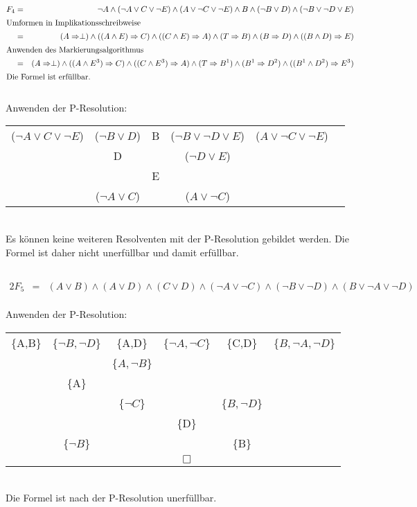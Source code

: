 \documentclass[10pt,a4paper,oneside,ngerman,numbers=noenddot]{scrartcl}
\begin{document}
\subsubsection{} %
\begin{alignat*}{2}
F_{4} &=& \neg A \wedge (\neg A \vee C \vee \neg E) \wedge (A \vee \neg C \vee \neg E) \wedge B \wedge (\neg B \vee D) \wedge (\neg B \vee \neg D \vee E) \\
\intertext{Umformen in Implikationsschreibweise}
&=& (A \Rightarrow \perp) \wedge ((A \wedge E) \Rightarrow C) \wedge ((C \wedge E) \Rightarrow A) \wedge (T \Rightarrow B) \wedge (B \Rightarrow D) \wedge ((B \wedge D) \Rightarrow E) \\
\intertext{Anwenden des Markierungsalgorithmus}
&=& (A \Rightarrow \perp) \wedge ((A \wedge E^{3}) \Rightarrow C) \wedge ((C \wedge E^{3}) \Rightarrow A) \wedge (T \Rightarrow B^{1}) \wedge (B^{1} \Rightarrow D^{2}) \wedge ((B^{1} \wedge D^{2}) \Rightarrow E^{3}) \\
\intertext{Die Formel ist erfüllbar.}
\end{alignat*}\\
Anwenden der P-Resolution:\\
\begin{tabular}{cccccc}
($\neg A \vee C \vee \neg E$) & ($\neg B \vee D$) & B & ($\neg B \vee \neg D \vee E$) & ($A \vee \neg C \vee \neg E$) \\
& D & & ($\neg D \vee E$) & & \\
& & E & & & \\
& ($\neg A \vee C$) & & ($A \vee \neg C$) & &
\end{tabular}\\
Es können keine weiteren Resolventen mit der P-Resolution gebildet werden. Die Formel ist daher nicht unerfüllbar und damit erfüllbar.
\subsection{} %
\begin{alignat*}{2}
F_{5} &=& (A \vee B) \wedge (A \vee D) \wedge (C \vee D) \wedge (\neg A \vee \neg C) \wedge (\neg B \vee \neg D) \wedge (B \vee \neg A \vee \neg D)
\end{alignat*}\\
Anwenden der P-Resolution:\\
\begin{tabular}{cccccc}
\{A,B\} & \{$\neg B, \neg D$\} & \{A,D\} & \{$\neg A, \neg C$\} & \{C,D\} & \{$B, \neg A, \neg D$\} \\
& & \{$A, \neg B$\} & & & \\
& \{A\} & & & & \\
& & \{$\neg C$\} & & \{$B, \neg D$\} & \\
& & & \{D\} & & \\
& \{$\neg B$\} & & & \{B\} & \\
& & & $\Box$ & &
\end{tabular}\\
Die Formel ist nach der P-Resolution unerfüllbar.
\end{document}
